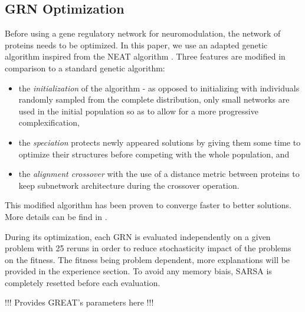 \subsection{GRN Optimization}
Before using a gene regulatory network for neuromodulation, the network of proteins needs to be optimized. In this paper, we use an adapted genetic algorithm inspired from the NEAT algorithm \cite{stanley2002evolving}. Three features are modified in comparison to a standard genetic algorithm:
\begin{itemize}
\item the \emph{initialization} of the algorithm  - as opposed to initializing with individuals randomly sampled from the complete distribution, only small networks are used in the initial population so as to allow for a more progressive complexification,
\item the \emph{speciation} protects newly appeared solutions by giving them some time to optimize their structures before competing with the whole population, and
\item the \emph{alignment crossover} with the use of a distance metric between proteins to keep subnetwork architecture during the crossover operation.
\end{itemize}
This modified algorithm has been proven to converge faster to better solutions. More details can be find in \cite{cussatblanc2015grneat}.

During its optimization, each GRN is evaluated independently on a given problem with 25 reruns in order to reduce stochasticity impact of the problems on the fitness. The fitness being problem dependent, more explanations will be provided in the experience section. To avoid any memory biais, SARSA is completely resetted before each evaluation. 

!!! Provides GREAT's parameters here !!!





